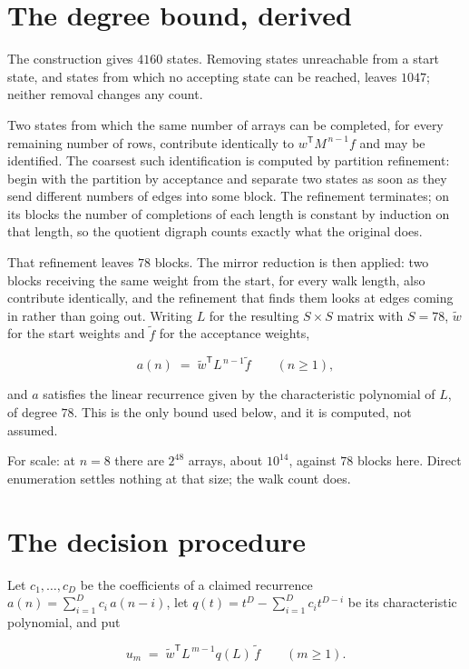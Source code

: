 \documentclass[11pt]{article}
\theoremstyle{definition}
\begin{document}
\section{The degree bound, derived}

The construction gives $4160$ states. Removing states unreachable from a start state, and states from which no accepting state can be reached, leaves $1047$; neither removal changes any count.

Two states from which the same number of arrays can be completed, for every remaining number of rows, contribute identically to $w^{\mathsf T}M^{\,n-1}f$ and may be identified. The coarsest such identification is computed by partition refinement: begin with the partition by acceptance and separate two states as soon as they send different numbers of edges into some block. The refinement terminates; on its blocks the number of completions of each length is constant by induction on that length, so the quotient digraph counts exactly what the original does.

That refinement leaves $78$ blocks. The mirror reduction is then applied: two blocks receiving the same weight from the start, for every walk length, also contribute identically, and the refinement that finds them looks at edges coming in rather than going out. Writing $L$ for the resulting $S \times S$ matrix with $S = 78$, $\tilde w$ for the start weights and $\tilde f$ for the acceptance weights,

\[a(n) \;=\; \tilde w^{\mathsf T} L^{\,n-1} \tilde f \qquad (n \ge 1),\]

and $a$ satisfies the linear recurrence given by the characteristic polynomial of $L$, of degree $78$. This is the only bound used below, and it is computed, not assumed.

For scale: at $n = 8$ there are $2^{48}$ arrays, about $10^{14}$, against $78$ blocks here. Direct enumeration settles nothing at that size; the walk count does.

\section{The decision procedure}

Let $c_1,\dots,c_D$ be the coefficients of a claimed recurrence $a(n) = \sum_{i=1}^{D} c_i\,a(n-i)$, let $q(t) = t^{D} - \sum_{i=1}^{D} c_i t^{D-i}$ be its characteristic polynomial, and put

\[u_m \;=\; \tilde w^{\mathsf T} L^{\,m-1} q(L)\,\tilde f \qquad (m \ge 1).\]
\end{document}
